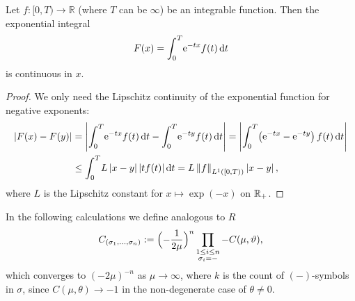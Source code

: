 \begin{Lemma}
  Let $f\colon [0,T)\to\mathbb{R}$ (where $T$ can be $\infty$) be an integrable
    function. Then the exponential integral
  \begin{align*}
    F(x) = \Integ[T]{0}{t}{\Eto{-tx} f(t)}
  \end{align*}
  is continuous in $x$.
  \begin{proof}
    We only need the Lipschitz continuity of the exponential function for
    negative exponents:
    \begin{align*}
      \lvert F(x) - F(y)\rvert &=
      \left|\Integ[T]{0}{t}{\Eto{-tx}f(t)} - \Integ[T]{0}{t}{\Eto{-ty}f(t)}\right|
      = \left|\Integ[T]{0}{t}{\left(\Eto{-tx}-\Eto{-ty}\right)f(t)}\right| \\
      &\le \Integ[T]{0}{t}{L\left|x - y\right| \lvert tf(t)\rvert}
      = L \left\|f\right\|_{L^1([0,T))} \left|x-y\right|,
    \end{align*}
    where $L$ is the Lipschitz constant for $x\mapsto\exp(-x)$ on $\Rplus$.
  \end{proof}
\end{Lemma}

In the following calculations we define analogous to $R$
\begin{align}
  C_{(\sigma_1,\ldots,\sigma_n)} := \Bigl(-\frac{1}{2\mu}\Bigr)^n
                                    \prod_{
                                      \substack{
                                        1\le i \le n \\
                                        \sigma_i = -
                                    }} -C(\mu,\theta),
\end{align}
which converges to $(-2\mu)^{-n}$ as $\mu\to\infty$, where $k$ is the count
of $(-)$-symbols in $\sigma$, since $C(\mu,\theta)\to -1$ in the non-degenerate
case of $\theta \neq 0$.


